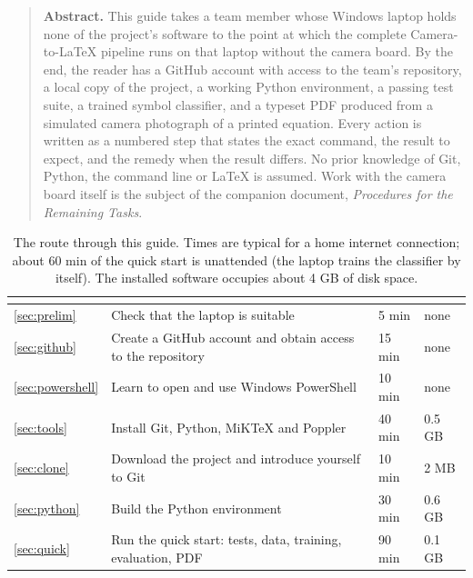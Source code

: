 \begin{quote}
\small
\textbf{Abstract.} This guide takes a team member whose Windows laptop holds none of the
project's software to the point at which the complete Camera-to-\LaTeX{} pipeline runs on that
laptop without the camera board. By the end, the reader has a GitHub account with access to the
team's repository, a local copy of the project, a working Python environment, a passing test
suite, a trained symbol classifier, and a typeset PDF produced from a simulated camera photograph
of a printed equation. Every action is written as a numbered step that states the exact command,
the result to expect, and the remedy when the result differs. No prior knowledge of Git, Python,
the command line or \LaTeX{} is assumed. Work with the camera board itself is the subject of the
companion document, \emph{Procedures for the Remaining Tasks}.
\end{quote}

\begin{table}[H]
\centering
\begin{tabular}{C{1.5cm}L{5.2cm}C{1.9cm}C{2.0cm}}
\toprule
{} &  &  &  \\
\midrule
\ref{sec:prelim} & Check that the laptop is suitable & 5 min & none \\
\ref{sec:github} & Create a GitHub account and obtain access to the repository & 15 min & none \\
\ref{sec:powershell} & Learn to open and use Windows PowerShell & 10 min & none \\
\ref{sec:tools} & Install Git, Python, MiKTeX and Poppler & 40 min & 0.5 GB \\
\ref{sec:clone} & Download the project and introduce yourself to Git & 10 min & 2 MB \\
\ref{sec:python} & Build the Python environment & 30 min & 0.6 GB \\
\ref{sec:quick} & Run the quick start: tests, data, training, evaluation, PDF & 90 min & 0.1 GB \\
\bottomrule
\end{tabular}
\caption{The route through this guide. Times are typical for a home internet connection; about
60 min of the quick start is unattended (the laptop trains the classifier by itself). The
installed software occupies about 4 GB of disk space.}
\label{tab:route}
\end{table}

